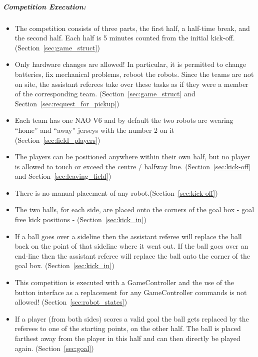 \subparagraph{Competition Execution:}
\begin{itemize}
	\item The competition consists of three parts, the first half, a half-time break, and the second half. Each half is 5 minutes counted from the initial kick-off. (\cf Section~\ref{sec:game_struct})
	
	\item Only hardware changes are allowed! In particular, it is permitted to change batteries, fix mechanical problems, reboot the robots. Since the teams are not on site, the assistant referees take over these tasks as if they were a member of the corresponding team. (\cf Section~\ref{sec:game_struct} and Section~\ref{sec:request_for_pickup})
	
	\item Each team has one NAO V6 and by default the two robots are wearing ``home'' and ``away'' jerseys with the number 2 on it (\cf Section~\ref{sec:field_players})
	
	\item The players can be positioned anywhere within their own half, but no player is allowed to touch or exceed the centre / halfway line. (\cf Section~\ref{sec:kick-off} and Section~\ref{sec:leaving_field})
	
	\item There is no manual placement of any robot.(\cf Section~\ref{sec:kick-off})
	
	\item The two balls, for each side, are placed onto the corners of the goal box - goal free kick positions - (\cf Section~\ref{sec:kick_in})
	
	\item If a ball goes over a sideline then the assistant referee will replace the ball back on the point of that sideline where it went out. If the ball goes over an end-line then the assistant referee will replace the ball onto the corner of the goal box. (\cf Section~\ref{sec:kick_in})
	
	\item This competition is executed with a GameController and the use of the button interface as a replacement for any GameController commands is not allowed! (\cf Section~\ref{sec:robot_states})
	
	\item If a player (from both sides) scores a valid goal the ball gets replaced by the referees to one of the starting points, on the other half. The ball is placed farthest away from the player in this half and can then directly be played again. (\cf Section~\ref{sec:goal})
	

\end{itemize}
